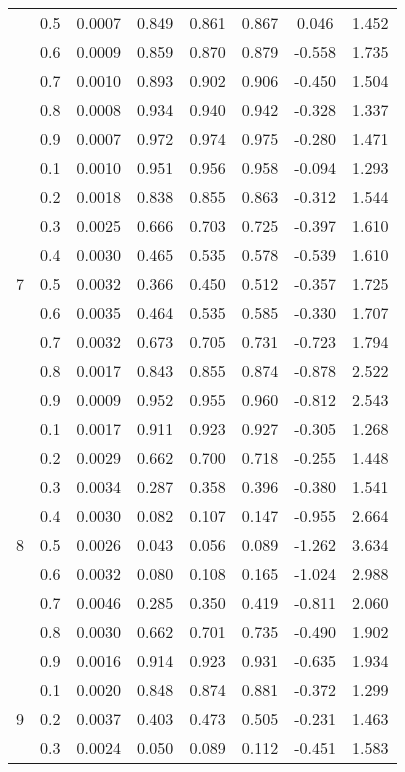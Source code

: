 \documentclass[11pt,a4paper]{report}
\begin{document}
\begin{longtable}{ | c | c || c | c | c | c | c | c | }
 & 0.5 & 0.0007 & 0.849 & 0.861 & 0.867 & 0.046 & 1.452 \\
 & 0.6 & 0.0009 & 0.859 & 0.870 & 0.879 & -0.558 & 1.735 \\
 & 0.7 & 0.0010 & 0.893 & 0.902 & 0.906 & -0.450 & 1.504 \\
 & 0.8 & 0.0008 & 0.934 & 0.940 & 0.942 & -0.328 & 1.337 \\
 & 0.9 & 0.0007 & 0.972 & 0.974 & 0.975 & -0.280 & 1.471 \\
 \hline
\multirow{9}{*}{7} & 0.1 & 0.0010 & 0.951 & 0.956 & 0.958 & -0.094 & 1.293 \\
 & 0.2 & 0.0018 & 0.838 & 0.855 & 0.863 & -0.312 & 1.544 \\
 & 0.3 & 0.0025 & 0.666 & 0.703 & 0.725 & -0.397 & 1.610 \\
 & 0.4 & 0.0030 & 0.465 & 0.535 & 0.578 & -0.539 & 1.610 \\
 & 0.5 & 0.0032 & 0.366 & 0.450 & 0.512 & -0.357 & 1.725 \\
 & 0.6 & 0.0035 & 0.464 & 0.535 & 0.585 & -0.330 & 1.707 \\
 & 0.7 & 0.0032 & 0.673 & 0.705 & 0.731 & -0.723 & 1.794 \\
 & 0.8 & 0.0017 & 0.843 & 0.855 & 0.874 & -0.878 & 2.522 \\
 & 0.9 & 0.0009 & 0.952 & 0.955 & 0.960 & -0.812 & 2.543 \\
 \hline
\multirow{9}{*}{8} & 0.1 & 0.0017 & 0.911 & 0.923 & 0.927 & -0.305 & 1.268 \\
 & 0.2 & 0.0029 & 0.662 & 0.700 & 0.718 & -0.255 & 1.448 \\
 & 0.3 & 0.0034 & 0.287 & 0.358 & 0.396 & -0.380 & 1.541 \\
 & 0.4 & 0.0030 & 0.082 & 0.107 & 0.147 & -0.955 & 2.664 \\
 & 0.5 & 0.0026 & 0.043 & 0.056 & 0.089 & -1.262 & 3.634 \\
 & 0.6 & 0.0032 & 0.080 & 0.108 & 0.165 & -1.024 & 2.988 \\
 & 0.7 & 0.0046 & 0.285 & 0.350 & 0.419 & -0.811 & 2.060 \\
 & 0.8 & 0.0030 & 0.662 & 0.701 & 0.735 & -0.490 & 1.902 \\
 & 0.9 & 0.0016 & 0.914 & 0.923 & 0.931 & -0.635 & 1.934 \\
 \hline
\multirow{9}{*}{9} & 0.1 & 0.0020 & 0.848 & 0.874 & 0.881 & -0.372 & 1.299 \\
 & 0.2 & 0.0037 & 0.403 & 0.473 & 0.505 & -0.231 & 1.463 \\
 & 0.3 & 0.0024 & 0.050 & 0.089 & 0.112 & -0.451 & 1.583 \\

\end{longtable}
\end{document}
